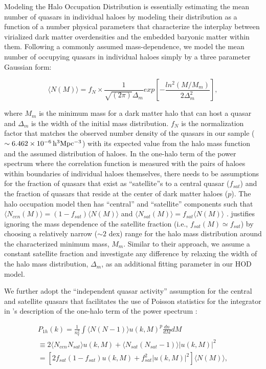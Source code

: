 \documentclass[useAMS,usenatbib]{mn2e}
\begin{document}
Modeling the Halo Occupation Distribution is essentially estimating the mean 
number of quasars in individual haloes by modeling their distribution as a 
function of a number physical parameters that characterize the interplay between 
virialized dark matter overdensities and the embedded baryonic matter within 
them.  Following a commonly assumed mass-dependence, we model the mean number of 
occupying quasars in individual haloes simply by a three parameter Gaussian 
form: 

\begin{equation}
\langle N(M) \rangle = f_{N} \times \frac{1}{\sqrt{\left(2\pi \right)}\Delta_m} exp[-\frac{ln^2(M/M_m)}{2\Delta^{2}_m}],
\end{equation}

where $M_m$ is the minimum mass for a dark matter halo that can host a quasar 
and $\Delta_m$ is the width of the initial mass distribution. $f_N$ is the 
normalization factor that matches the observed number density of the quasars in 
our sample ($\sim6.462 \times 10^{-6} \, \rm h^3 Mpc^{-3}$) with its expected 
value from the halo mass function and the assumed distribution of haloes.
In the one-halo term of the power spectrum where the correlation function is 
measured with the pairs of haloes within boundaries of individual haloes 
themselves, there needs to be assumptions for the fraction of quasars that exist 
as ``satellite''s to a central quasar ($f_{sat}$) and the fraction of quasars 
that reside at the center of dark matter haloes ($p$). 
The halo occupation model then has ``central'' and ``satellite'' components such 
that $\langle N_{cen}(M)\rangle = (1-f_{sat})\langle N(M)\rangle$ and $\langle 
N_{sat}(M)\rangle = f_{sat} \langle N(M)\rangle$ \citep{bw02,kra04, zh05}.
\citet{ko12} justifies ignoring the mass dependence of the satellite fraction 
(i.e., $f_{sat}(M) \simeq f_{sat}$) by choosing a relatively narrow ($\sim 2$ 
dex) range for the halo mass distribution around the characterized minimum mass, 
$M_m$. Similar to their approach, we assume a constant satellite fraction and 
investigate any difference by relaxing the width of the halo mass distribution, 
$\Delta_m$, as an additional fitting parameter in our HOD model. 

We further adopt the ``independent quasar activity'' assumption for the central 
and satellite quasars that facilitates the use of Poisson statistics for the 
integrator in \citep{sel00}'s description of the one-halo term of the power 
spectrum \citep{ko12}:

 \begin{multline}
P_{1h}(k) = \frac{1}{n^{2}_{q}} \int \langle N(N-1)\rangle u(k,M)^p \frac{dn}{dM} dM  \\
\equiv 2 \langle N_{cen} N_{sat}\rangle u(k,M) + \langle N_{sat}(N_{sat}-1)\rangle |u(k,M)|^2 \\
%  
= [2 f_{sat}(1-f_{sat}) u(k,M)+f_{sat}^2 |u(k,M)|^2] \langle N(M)\rangle,
 \end{multline}
\end{document}
